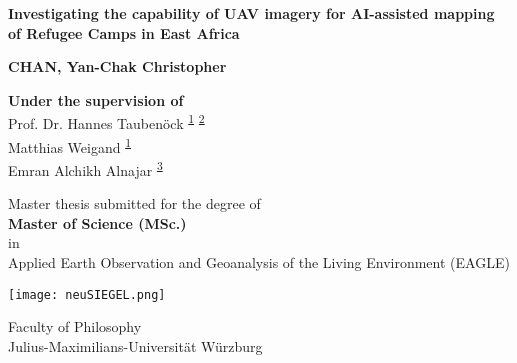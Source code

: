 \documentclass[11pt, a4paper, twoside]{report}
\begin{document}
\begin{titlepage}
   \begin{center}
       \vspace{0.25cm}

       \large
       \textbf{Investigating the capability of UAV imagery for AI-assisted mapping of Refugee Camps in East Africa}

       \vspace{0.75cm}

       \normalsize
       \textbf{CHAN, Yan-Chak Christopher}

       \vspace{2cm}

       \textbf{Under the supervision of} \\
       Prof. Dr. Hannes Taubenöck \textsuperscript{\hyperlink{DLR}{1}} \textsuperscript{\hyperlink{JMWU}{2}} \\
       Matthias Weigand \textsuperscript{\hyperlink{DLR}{1}} \\
       Emran Alchikh Alnajar \textsuperscript{\hyperlink{HOT}{3}}

       \vspace{1cm}

       Master thesis submitted for the degree of\\
       \textbf{Master of Science (MSc.)}\\
       \vspace{0.25cm}
       in\\
       \vspace{0.25cm}
       Applied Earth Observation and Geoanalysis of the Living Environment (EAGLE)

       \vspace{0.5cm}

       \texttt{[image: neuSIEGEL.png]}

       \vspace{0.5cm}

       \normalsize
       Faculty of Philosophy\\
       Julius-Maximilians-Universität Würzburg\\


   \end{center}
\end{titlepage}
\end{document}
